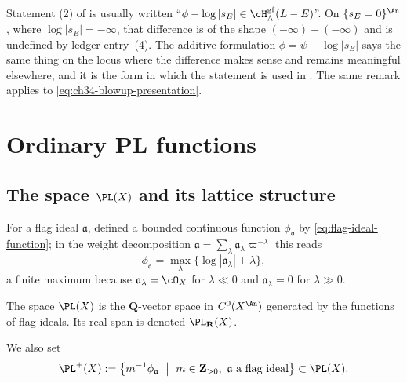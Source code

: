 \begin{remark}
\label{rem:ch34-additive-form}
Statement (2) of  is usually written
``$\phi-\log|s_E|\in\cH^{\mathrm{gf}}_\Lambda(L-E)$''.  On
$\{s_E=0\}^{\An}$, where $\log|s_E|=-\infty$, that difference is of the
shape $(-\infty)-(-\infty)$ and is undefined by ledger entry~(4).  The
additive formulation $\phi=\psi+\log|s_E|$ says the same thing on the
locus where the difference makes sense and remains meaningful elsewhere,
and it is the form in which the statement is used in
.  The same remark applies to
\eqref{eq:ch34-blowup-presentation}.
\end{remark}
\section{Ordinary PL functions}
\label{sec:ch34-pl}

\subsection{The space \texorpdfstring{$\PL(X)$}{PL(X)} and its lattice structure}

For a flag ideal $\mathfrak a$, 
defined a bounded continuous function $\phi_{\mathfrak a}$ by
\eqref{eq:flag-ideal-function}; in the weight decomposition
$\mathfrak a=\sum_\lambda\mathfrak a_\lambda\varpi^{-\lambda}$ this reads
\begin{equation}
\label{eq:ch34-flag-weight-form}
 \phi_{\mathfrak a}
 =\max_{\lambda}\{\log|\mathfrak a_\lambda|+\lambda\},
\end{equation}
a finite maximum because $\mathfrak a_\lambda=\cO_X$ for
$\lambda\ll0$ and $\mathfrak a_\lambda=0$ for $\lambda\gg0$.

\begin{definition}
\label{def:bj-pl-function}
The space $\PL(X)$ is the $\mathbf Q$-vector space in
$C^0(X^{\An})$ generated by the functions of flag ideals.  Its real span
is denoted $\PL_{\mathbf R}(X)$.
\end{definition}

We also set
\begin{equation}
\label{eq:ch34-pl-plus}
 \PL^+(X):=
 \bigl\{m^{-1}\phi_{\mathfrak a}\ \bigm|\
 m\in\mathbf Z_{>0},\ \mathfrak a\ \text{a flag ideal}\bigr\}
 \subset\PL(X).
\end{equation}

